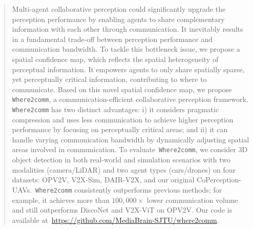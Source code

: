 \begin{abstract}
Multi-agent collaborative perception could significantly upgrade the perception performance by enabling agents to share complementary information with each other through communication. It inevitably results in a fundamental trade-off between perception performance and communication bandwidth. To tackle this bottleneck issue, we propose a spatial confidence map, which reflects the spatial heterogeneity of perceptual information. It empowers agents to only share spatially sparse, yet perceptually critical information, contributing to where to communicate. Based on this novel spatial confidence map, we propose \texttt{Where2comm}, a communication-efficient collaborative perception framework. \texttt{Where2comm} has two distinct advantages: i) it considers pragmatic compression and uses less communication to achieve higher perception performance by focusing on perceptually critical areas; and ii) it can handle varying communication bandwidth by dynamically adjusting spatial areas involved in communication. To evaluate~\texttt{Where2comm}, we consider 3D object detection in both real-world and simulation scenarios with two modalities (camera/LiDAR) and two agent types (cars/drones) on four datasets: OPV2V, V2X-Sim, DAIR-V2X, and our original CoPerception-UAVs.~\texttt{Where2comm} consistently outperforms previous methods; for example, it achieves more than $100,000 \times$ lower communication volume and still outperforms DiscoNet and V2X-ViT on OPV2V. Our code is available at~\url{https://github.com/MediaBrain-SJTU/where2comm}.
\vspace{-2mm}

\end{abstract}

